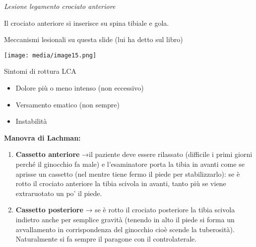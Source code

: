 \documentclass[]{article}
\begin{document}
\emph{Lesione legamento crociato anteriore }

Il crociato anteriore si inserisce su spina tibiale e gola.

Meccanismi lesionali su questa slide (lui ha detto sul libro)

\texttt{[image: media/image15.png]}

Sintomi di rottura LCA

\begin{itemize}
\item
  Dolore più o meno intenso (non eccessivo)
\item
  Versamento ematico (non sempre)
\item
  Instabilità
\end{itemize}

\textbf{Manovra di Lachman: }

\begin{enumerate}
\def\labelenumi{\arabic{enumi}.}
\item
  \textbf{Cassetto anteriore} →il paziente deve essere rilassato
  (difficile i primi giorni perché il ginocchio fa male) e l'esaminatore
  porta la tibia in avanti come se aprisse un cassetto (nel mentre tiene
  fermo il piede per stabilizzarlo): se è rotto il crociato anteriore la
  tibia scivola in avanti, tanto più se viene extraruotato un po' il
  piede.
\item
  \textbf{Cassetto posteriore} → se è rotto il crociato posteriore la
  tibia scivola indietro anche per semplice gravità (tenendo in alto il
  piede si forma un avvallamento in corrispondenza del ginocchio cioè
  scende la tuberosità). Naturalmente si fa sempre il paragone con il
  controlaterale.
\end{enumerate}
\end{document}
